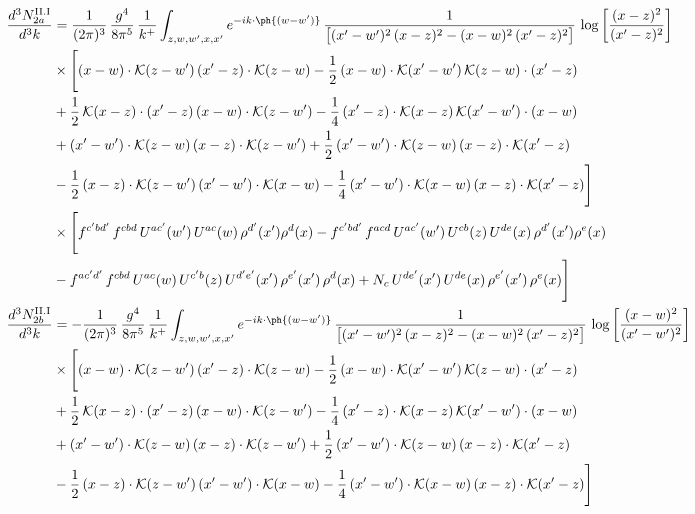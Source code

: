 \begin{align}
\frac{d^{3}N^{\rm II.I}_{2a}}{d^{3}k}&=\frac{1}{(2\pi)^{3}}\,\frac{g^{4}}{8\pi^{5}}\,\frac{1}{k^{+}}\int_{z,w,w^{\prime},x,x^{\prime}}e^{-ik\cdot\ph{(w-w^{\prime})}}\,\frac{1}{\big[(x^{\prime}-w^{\prime})^{2}\,(x-z)^{2}-(x-w)^{2}\,(x^{\prime}-z)^{2}\big]}\,\log\left[\frac{(x-z)^{2}}{(x^{\prime}-z)^{2}}\right]\notag\\
&\times\Bigg[(x-w)\cdot\mathcal{K}(z-w^{\prime})\,(x^{\prime}-z)\cdot\mathcal{K}(z-w)-\frac{1}{2}\,(x-w)\cdot\mathcal{K}(x^{\prime}-w^{\prime})\,\mathcal{K}(z-w)\cdot(x^{\prime}-z)\notag \\ & +\frac{1}{2}\,\mathcal{K}(x-z)\cdot(x^{\prime}-z)\,(x-w)\cdot\mathcal{K}(z-w^{\prime}) -\frac{1}{4}\,(x^{\prime}-z)\cdot\mathcal{K}(x-z)\,\mathcal{K}(x^{\prime}-w^{\prime})\cdot(x-w)\notag \\ & +(x^{\prime}-w^{\prime})\cdot\mathcal{K}(z-w)\,(x-z)\cdot\mathcal{K}(z-w^{\prime})+\frac{1}{2}\,(x^{\prime}-w^{\prime})\cdot\mathcal{K}(z-w)\,(x-z)\cdot\mathcal{K}(x^{\prime}-z)\notag \\ & -\frac{1}{2}\,(x-z)\cdot\mathcal{K}(z-w^{\prime})\,(x^{\prime}-w^{\prime})\cdot\mathcal{K}(x-w)-\frac{1}{4}\,(x^{\prime}-w^{\prime})\cdot\mathcal{K}(x-w)\,(x-z)\cdot\mathcal{K}(x^{\prime}-z)\Bigg]\notag \\ & \times\Bigg[f^{c^{\prime}bd^{\prime}}\,f^{cbd}\, U^{ac^{\prime}}(w^{\prime})\,U^{ac}(w)\,\rho^{d^{\prime}}(x^{\prime})\rho^{d}(x)- f^{c^{\prime}bd^{\prime}}\,f^{acd}\,U^{ac^{\prime}}(w^{\prime})\,U^{cb}(z)\,U^{de}(x)\,\rho^{d^{\prime}}(x^{\prime})\rho^{e}(x) \notag \\ & -f^{ac^{\prime}d^{\prime}}\,f^{cbd}\,U^{ac}(w)\,U^{c^{\prime}b}(z)\,U^{d^{\prime}e^{\prime}}(x^{\prime})\,\rho^{e^{\prime}}(x^{\prime})\,\rho^{d}(x) +N_{c}\,U^{de^{\prime}}(x^{\prime})\,U^{de}(x)\,\rho^{e^{\prime}}(x^{\prime})\,\rho^{e}(x)\Bigg]\\
\frac{d^{3}N^{\rm II.I}_{2b}}{d^{3}k}&= -\frac{1}{(2\pi)^{3}}\,\frac{g^{4}}{8\pi^{5}}\,\frac{1}{k^{+}}\int_{z,w,w^{\prime},x,x^{\prime}}e^{-ik\cdot\ph{(w-w^{\prime})}}\,\frac{1}{\big[(x^{\prime}-w^{\prime})^{2}\,(x-z)^{2}-(x-w)^{2}\,(x^{\prime}-z)^{2}\big]}\,\log\left[\frac{(x-w)^{2}}{(x^{\prime}-w^{\prime})^{2}}\right]\notag\\
&\times\Bigg[(x-w)\cdot\mathcal{K}(z-w^{\prime})\,(x^{\prime}-z)\cdot\mathcal{K}(z-w)-\frac{1}{2}\,(x-w)\cdot\mathcal{K}(x^{\prime}-w^{\prime})\,\mathcal{K}(z-w)\cdot(x^{\prime}-z)\notag \\ & +\frac{1}{2}\,\mathcal{K}(x-z)\cdot(x^{\prime}-z)\,(x-w)\cdot\mathcal{K}(z-w^{\prime}) -\frac{1}{4}\,(x^{\prime}-z)\cdot\mathcal{K}(x-z)\,\mathcal{K}(x^{\prime}-w^{\prime})\cdot(x-w)\notag \\ & +(x^{\prime}-w^{\prime})\cdot\mathcal{K}(z-w)\,(x-z)\cdot\mathcal{K}(z-w^{\prime})+\frac{1}{2}\,(x^{\prime}-w^{\prime})\cdot\mathcal{K}(z-w)\,(x-z)\cdot\mathcal{K}(x^{\prime}-z)\notag \\ & -\frac{1}{2}\,(x-z)\cdot\mathcal{K}(z-w^{\prime})\,(x^{\prime}-w^{\prime})\cdot\mathcal{K}(x-w)-\frac{1}{4}\,(x^{\prime}-w^{\prime})\cdot\mathcal{K}(x-w)\,(x-z)\cdot\mathcal{K}(x^{\prime}-z)\Bigg]\notag\\

\end{align}
